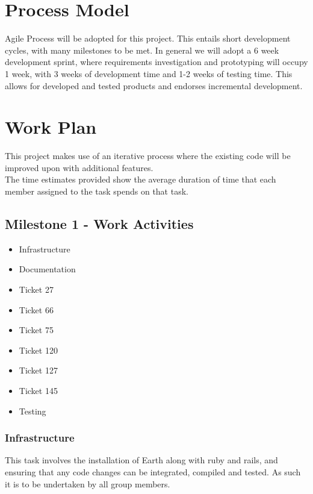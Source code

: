 \documentclass{article}
\begin{document}
\newpage

\section{Process Model}

Agile Process will be adopted for this project. This entails short development cycles, with many milestones to be met. In general we will adopt a 6 week development sprint, where requirements investigation and prototyping will occupy 1 week, with 3 weeks of development time and 1-2 weeks of testing time. This allows for developed and tested products and endorses incremental development.
\\

\section{Work Plan}
\label{sec:work-plan}

This project makes use of an iterative process where the existing code will be improved upon with additional features.
\\
The time estimates provided show the average duration of time that each member assigned to the task spends on that task.

\subsection{Milestone 1 - Work Activities}

\begin{itemize}
\item Infrastructure
\item Documentation
\item Ticket 27
\item Ticket 66
\item Ticket 75
\item Ticket 120
\item Ticket 127
\item Ticket 145
\item Testing
\end{itemize}

\subsubsection{Infrastructure}
	This task involves the installation of Earth along with ruby and rails, and ensuring that any code changes can be integrated, compiled and tested. As such it is to be undertaken by all group members.\\
	
\end{document}

